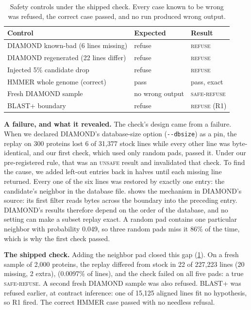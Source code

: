 \documentclass[letterpaper,twocolumn,10pt]{article}
\theoremstyle{definition}
\newcommand{\dec}[1]{\textsc{#1}}
\begin{document}
\begin{table}[t]
\caption{Safety controls under the shipped check. Every case known to be wrong was refused, the correct case passed,
and no run produced wrong output.}
\label{tab:safety}
\centering\small
\setlength{\tabcolsep}{3pt}
\begin{tabular}{@{}>{\raggedright\arraybackslash}p{3.7cm}ll@{}}
\toprule
Control & Expected & Result \\
\midrule
DIAMOND known-bad (6 lines missing)   & refuse & \dec{refuse} \\
DIAMOND regenerated (22 lines differ) & refuse & \dec{refuse} \\
Injected 5\% candidate drop           & refuse & \dec{refuse} \\
HMMER whole genome (correct)          & pass   & pass, exact \\
Fresh DIAMOND sample                  & no wrong output & \dec{safe-refuse} \\
BLAST+ boundary                       & refuse & \dec{refuse} (R1) \\
\bottomrule
\end{tabular}
\end{table}

\textbf{A failure, and what it revealed.} The check's design came from a failure. When we declared DIAMOND's database-size
option (\texttt{-{}-dbsize}) as a pin, the replay on 300 proteins lost 6 of 31{,}377 stock lines while every other line
was byte-identical, and our first check, which used only random pads, passed it. Under our pre-registered rule, that was
an \dec{unsafe} result and invalidated that check. To find the cause, we added left-out entries back in halves until each
missing line returned. Every one of the six lines was restored by exactly one entry: the candidate's neighbor in the
database file.  shows the mechanism in DIAMOND's source: its first filter reads bytes across the
boundary into the preceding entry. DIAMOND's results therefore depend on the order of the database, and no setting can make
a subset replay exact. A random pad contains one particular neighbor with probability 0.049, so three random pads miss it
86\% of the time, which is why the first check passed.

\textbf{The shipped check.} Adding the neighbor pad closed this gap (\cref{tab:safety}). On a fresh sample of 2{,}000
proteins, the replay differed from stock in 22 of 227{,}223 lines (20 missing, 2 extra), (0.0097\% of lines), and the check failed on all five pads: a true \dec{safe-refuse}. A second fresh DIAMOND sample was also refused. BLAST+ was refused earlier, at contract
inference: one of 15{,}125 aligned lines fit no hypothesis, so R1 fired. The correct HMMER case passed with no needless
refusal.
\end{document}

